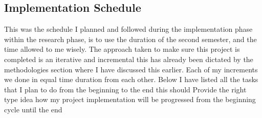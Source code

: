 \subsection{Implementation Schedule}
This was the schedule I  planned  and followed during the implementation phase within the research phase,  is to use the  duration  of  the second semester, and the time allowed to me wisely. The approach taken to make sure this project is completed is an iterative and incremental this has already been dictated by the methodologies section where I have discussed this earlier. Each of my increments we done  in equal time duration from each other.  Below I have listed all the tasks that I plan to do from the beginning to the end this should Provide the right type idea how my project implementation will be progressed from the beginning cycle until the end

